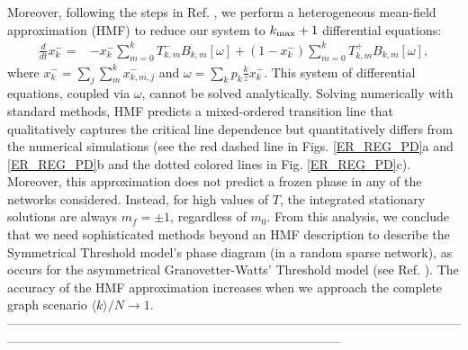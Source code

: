 Moreover, following the steps in Ref. \cite{gleeson-2013}, we perform a heterogeneous mean-field approximation (HMF) to reduce our system to $k_{\rm max}+1$ differential equations:
\begin{eqnarray}
\frac{d}{d t} x^{-}_{k}= &- x^{-}_{k} \sum_{m=0}^{k} T^{-}_{k, m} B_{k, m}[\omega] +\left(1-x^{-}_{k}\right) \sum_{m=0}^{k} T^{+}_{k, m} B_{k, m}[\omega],
\label{eq:HMF}
\end{eqnarray}
where $x^{-}_{k} = \sum_{j} \sum_{m}^{k} x^{-}_{k,m,j}$ and $\omega= \sum_k p_k \frac{k}{z} x^{-}_{k}$. This system of differential equations, coupled via $\omega$, cannot be solved analytically. Solving numerically with standard methods, HMF predicts a mixed-ordered transition line that qualitatively captures the critical line dependence but quantitatively differs from the numerical simulations (see the red dashed line in Figs. \ref{ER_REG_PD}a and \ref{ER_REG_PD}b and the dotted colored lines in Fig. \ref{ER_REG_PD}c). Moreover, this approximation does not predict a frozen phase in any of the networks considered. Instead, for high values of $T$, the integrated stationary solutions are always $m_f = \pm 1$, regardless of $m_0$. From this analysis, we conclude that we need sophisticated methods beyond an HMF description to describe the Symmetrical Threshold model's phase diagram (in a random sparse network), as occurs for the asymmetrical Granovetter-Watts' Threshold model (see Ref. \cite{Abella-2022-AME}). The accuracy of the HMF approximation increases when we approach the complete graph scenario $\langle k \rangle/ N \to 1$.
--------------------------------------------------------------------------------------------------------------------------------------------------------------------------------------------

